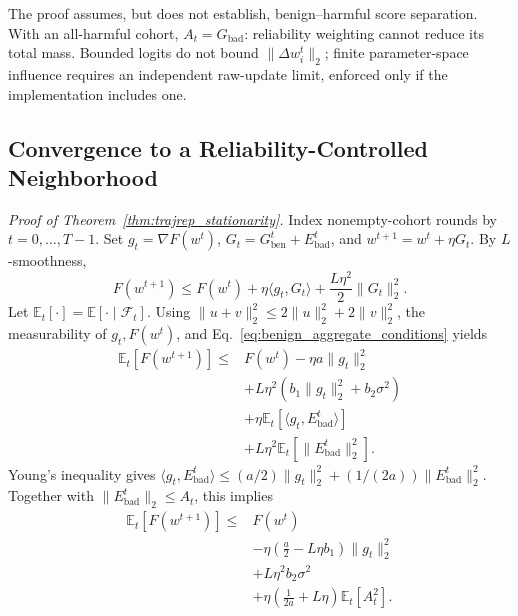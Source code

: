 \noindent The proof assumes, but does not establish, benign--harmful score separation. With an all-harmful cohort, $A_t=G_{\mathrm{bad}}$: reliability weighting cannot reduce its total mass. Bounded logits do not bound $\|\Delta w_i^t\|_2$; finite parameter-space influence requires an independent raw-update limit, enforced only if the implementation includes one.

\subsection{Convergence to a Reliability-Controlled Neighborhood}
\label{app:proof_stationarity}

\noindent\textit{Proof of Theorem~\ref{thm:trajrep_stationarity}.} Index nonempty-cohort rounds by $t=0,\ldots,T-1$. Set $g_t=\nabla F(w^t)$, $G_t=G_{\mathrm{ben}}^t+E_{\mathrm{bad}}^t$, and $w^{t+1}=w^t+\eta G_t$. By $L$-smoothness,
\begin{equation}
F(w^{t+1})\leq F(w^t)+\eta\langle g_t,G_t\rangle+\frac{L\eta^2}{2}\|G_t\|_2^2.
\label{eq:app_smoothness_step}
\end{equation}
Let $\mathbb E_t[\cdot]=\mathbb E[\cdot\mid\mathcal F_t]$. Using $\|u+v\|_2^2\leq2\|u\|_2^2+2\|v\|_2^2$, the measurability of $g_t,F(w^t)$, and Eq.~\eqref{eq:benign_aggregate_conditions} yields
\begin{equation}
\begin{aligned}
\mathbb E_t[F(w^{t+1})]\leq{}&F(w^t)-\eta a\|g_t\|_2^2\\
&+L\eta^2(b_1\|g_t\|_2^2+b_2\sigma^2)\\
&+\eta\mathbb E_t[\langle g_t,E_{\mathrm{bad}}^t\rangle]\\
&+L\eta^2\mathbb E_t[\|E_{\mathrm{bad}}^t\|_2^2].
\end{aligned}
\label{eq:app_conditional_descent}
\end{equation}
Young's inequality gives $\langle g_t,E_{\mathrm{bad}}^t\rangle\leq(a/2)\|g_t\|_2^2+(1/(2a))\|E_{\mathrm{bad}}^t\|_2^2$. Together with $\|E_{\mathrm{bad}}^t\|_2\leq A_t$, this implies
\begin{equation}
\begin{aligned}
\mathbb E_t[F(w^{t+1})]\leq{}&F(w^t)\\
&-\eta\left(\frac a2-L\eta b_1\right)\|g_t\|_2^2\\
&+L\eta^2b_2\sigma^2\\
&+\eta\left(\frac{1}{2a}+L\eta\right)\mathbb E_t[A_t^2].
\end{aligned}
\label{eq:app_descent_recursion}
\end{equation}

